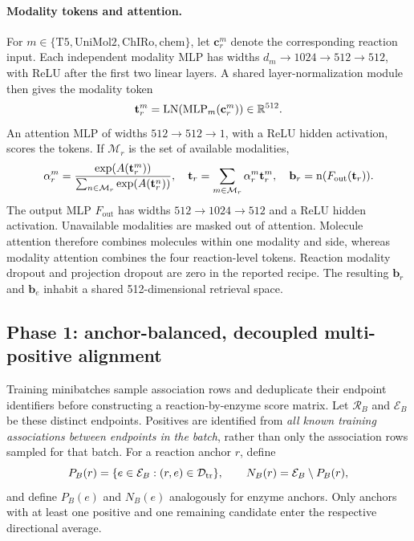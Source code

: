 \paragraph{Modality tokens and attention.}
For $m\in\{\mathrm{T5},\mathrm{UniMol2},\mathrm{ChIRo},\mathrm{chem}\}$,
let $\mathbf{c}_r^m$ denote the corresponding reaction input. Each independent modality
MLP has widths $d_m\!\to\!1024\!\to\!512\!\to\!512$, with ReLU after
the first two linear layers. A shared layer-normalization module then gives
the modality token
\begin{equation}
  \mathbf{t}_r^m=\operatorname{LN}(\operatorname{MLP}_m(\mathbf{c}_r^m))\in\mathbb{R}^{512}.
\end{equation}
An attention MLP of widths $512\!\to\!512\!\to\!1$, with a ReLU hidden
activation, scores the tokens. If $\mathcal M_r$ is the set of available
modalities,
\begin{equation}
  \alpha_r^m=
  \frac{\exp(A(\mathbf{t}_r^m))}{\sum_{n\in\mathcal M_r}\exp(A(\mathbf{t}_r^n))},
  \quad
  \mathbf{t}_r=\sum_{m\in\mathcal M_r}\alpha_r^m \mathbf{t}_r^m,
  \quad
  \mathbf{b}_r=\operatorname{n}(F_{\mathrm{out}}(\mathbf{t}_r)).
  \label{eq:v4-reaction-output}
\end{equation}
The output MLP $F_{\mathrm{out}}$ has widths $512\!\to\!1024\!\to\!512$ and a ReLU
hidden activation. Unavailable modalities are masked out of attention.
Molecule attention therefore combines molecules within one modality and
side, whereas modality attention combines the four reaction-level tokens.
Reaction modality dropout and projection dropout are zero in the reported
recipe. The resulting $\mathbf{b}_r$ and $\mathbf{b}_e$ inhabit a shared 512-dimensional
retrieval space.

\subsection{Phase 1: anchor-balanced, decoupled multi-positive alignment}
\label{sec:v4-phase1}
Training minibatches sample association rows and deduplicate their endpoint
identifiers before constructing a reaction-by-enzyme score matrix. Let
$\mathcal R_B$ and $\mathcal E_B$ be these distinct endpoints. Positives are
identified from \emph{all known training associations between endpoints in
the batch}, rather than only the association rows sampled for that batch.
For a reaction anchor $r$, define
\begin{equation}
  P_B(r)=\{e\in\mathcal E_B:(r,e)\in\mathcal{D}_{\mathrm{tr}}\},\qquad
  N_B(r)=\mathcal E_B\setminus P_B(r),
\end{equation}
and define $P_B(e)$ and $N_B(e)$ analogously for enzyme anchors. Only anchors
with at least one positive and one remaining candidate enter the respective
directional average.

